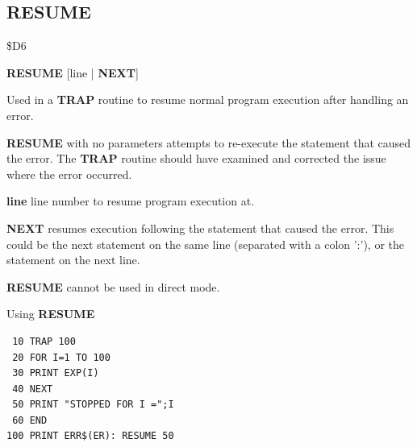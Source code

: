
\newpage
\subsection{RESUME}
\begin{description}[leftmargin=2cm,style=nextline]
\item [Token:] \$D6
\item [Format:] {\bf RESUME} [line | {\bf NEXT}]
\item [Usage:]  Used in a {\bf TRAP} routine to
                resume normal program execution after
                handling an error.

                {\bf RESUME} with no parameters attempts to
                re-execute the statement that caused the error.
                The {\bf TRAP} routine should have examined
                and corrected the issue where the error occurred.

                {\bf line} line number to resume program execution at.

                {\bf NEXT} resumes execution following the statement that caused
                the error. This could be the next statement on the same line
                (separated with a colon ':'), or the statement on the next line.

\item [Remarks:] {\bf RESUME} cannot be used in direct mode.
\item [Example:] Using {\bf RESUME}

\begin{tcolorbox}[colback=black,coltext=white]
\verbatimfont{\codefont}
\begin{verbatim}
 10 TRAP 100
 20 FOR I=1 TO 100
 30 PRINT EXP(I)
 40 NEXT
 50 PRINT "STOPPED FOR I =";I
 60 END
100 PRINT ERR$(ER): RESUME 50
\end{verbatim}
\end{tcolorbox}
\end{description}


\newpage
